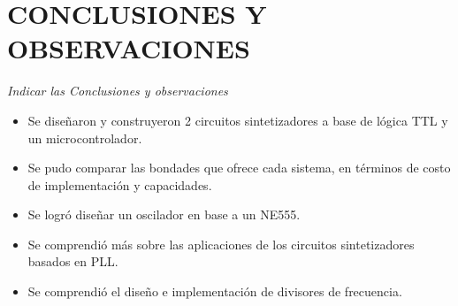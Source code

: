 \section{CONCLUSIONES Y OBSERVACIONES}

{\it Indicar las Conclusiones y observaciones}

\begin{itemize}
    \item Se diseñaron y construyeron 2 circuitos sintetizadores a base de lógica TTL y un microcontrolador.
    \item Se pudo comparar las bondades que ofrece cada sistema, en términos de costo de implementación y capacidades.
    \item Se logró diseñar un oscilador en base a un NE555.
    \item Se comprendió más sobre las aplicaciones de los circuitos sintetizadores basados en PLL.
    \item Se comprendió el diseño e implementación de divisores de frecuencia.
\end{itemize}
